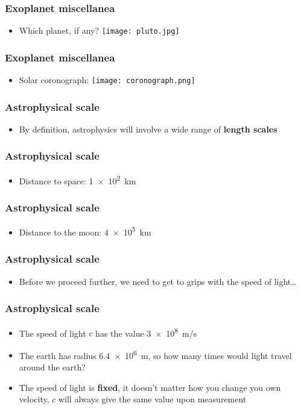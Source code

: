 \documentclass{beamer}
\begin{document}
\begin{frame}
  \frametitle{Exoplanet miscellanea}
  \begin{itemize}
    \item Which planet, if any?
      \texttt{[image: pluto.jpg]}
  \end{itemize}
\end{frame}

\begin{frame}
  \frametitle{Exoplanet miscellanea}
  \begin{itemize}
    \item Solar coronograph:
      \texttt{[image: coronograph.png]}
  \end{itemize}
\end{frame}

\begin{frame}
  \frametitle{Astrophysical scale}
  \begin{itemize}
    \item By definition, astrophysics will involve a wide range of \textbf{length scales}
  \end{itemize}
\end{frame}

\begin{frame}
  \frametitle{Astrophysical scale}
  \begin{itemize}
    \item Distance to space: \SI{1e2}{km}
  \end{itemize}
\end{frame}

\begin{frame}
  \frametitle{Astrophysical scale}
  \begin{itemize}
    \item Distance to the moon: \SI{4e5}{km}
  \end{itemize}
\end{frame}

\begin{frame}
  \frametitle{Astrophysical scale}
  \begin{itemize}
    \item Before we proceed further, we need to get to grips with the speed of light\ldots
  \end{itemize}
\end{frame}

\begin{frame}
  \frametitle{Astrophysical scale}
  \begin{itemize}
    \item The speed of light $c$ has the value \SI{3e8}{m/s}
    \item The earth has radius \SI{6.4e6}{m}, so how many times would light travel around the earth?
    \item The speed of light is \textbf{fixed}, it doesn't matter how you change you own velocity, $c$ will always give the same value upon measurement
  \end{itemize}
\end{frame}
\end{document}
